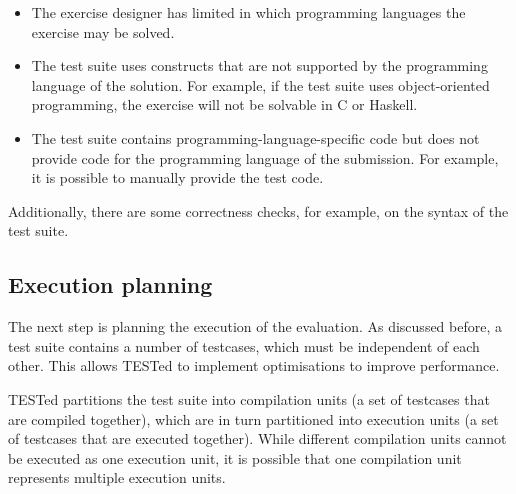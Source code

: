 \documentclass[../main]{subfiles}
\begin{document}
\begin{itemize}
    \item The exercise designer has limited in which programming languages the exercise may be solved.
    \item The test suite uses constructs that are not supported by the programming language of the solution.
          For example, if the test suite uses object-oriented programming, the exercise will not be solvable in C or Haskell.
    \item The test suite contains programming-language-specific code but does not provide code for the programming language of the submission.
          For example, it is possible to manually provide the test code.
\end{itemize}

Additionally, there are some correctness checks, for example, on the syntax of the test suite.

\subsection{Execution planning}\label{subsec:execution-planning}

The next step is planning the execution of the evaluation.
As discussed before, a test suite contains a number of testcases, which must be independent of each other.
This allows TESTed to implement optimisations to improve performance.

TESTed partitions the test suite into compilation units (a set of testcases that are compiled together), which are in turn partitioned into execution units (a set of testcases that are executed together).
While different compilation units cannot be executed as one execution unit, it is possible that one compilation unit represents multiple execution units.
\end{document}
